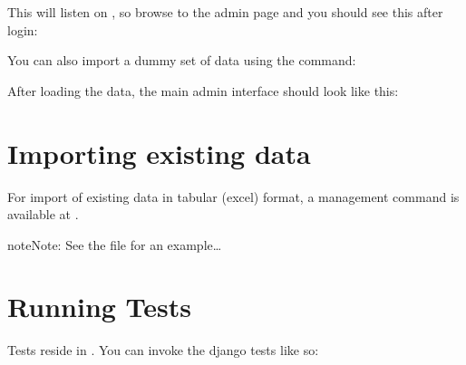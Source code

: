 \documentclass[letterpaper,10pt,openany,oneside,english]{sphinxmanual}
\begin{document}
This will listen on , so browse to the admin page
 and you should see this after login:

\noindent{}

You can also import a dummy set of data using the  command:

%
\begin{sphinxVerbatim}[commandchars=\\\{\}]
   
\end{sphinxVerbatim}

After loading the data, the main admin interface should look like this:

\noindent{}


\section{Importing existing data}
\label{\detokenize{index:importing-existing-data}}
For import of existing data in tabular (excel) format, a management command is available at
.

%
\begin{sphinxVerbatim}[commandchars=\\\{\}]
  
\end{sphinxVerbatim}

\begin{sphinxadmonition}{note}{Note:}
See the file  for an example…
\end{sphinxadmonition}

\noindent{}


\section{Running Tests}
\label{\detokenize{index:running-tests}}
Tests reside in .
You can invoke the django tests like so:
\end{document}
